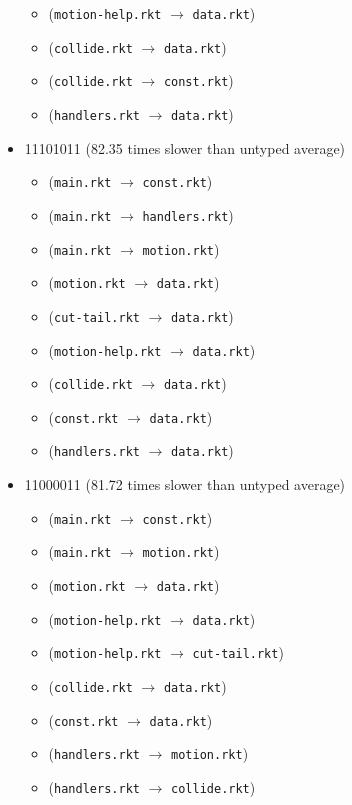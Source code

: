 \documentclass{article}
\newcommand{\mono}[1]{\texttt{#1}}
\begin{document}
\begin{itemize}
\begin{itemize}
  \item (\mono{motion-help.rkt} $\rightarrow$ \mono{data.rkt})
  \item (\mono{collide.rkt} $\rightarrow$ \mono{data.rkt})
  \item (\mono{collide.rkt} $\rightarrow$ \mono{const.rkt})
  \item (\mono{handlers.rkt} $\rightarrow$ \mono{data.rkt})
  \end{itemize}
\item 11101011 (82.35 times slower than untyped average)
  \begin{itemize}
  \item (\mono{main.rkt} $\rightarrow$ \mono{const.rkt})
  \item (\mono{main.rkt} $\rightarrow$ \mono{handlers.rkt})
  \item (\mono{main.rkt} $\rightarrow$ \mono{motion.rkt})
  \item (\mono{motion.rkt} $\rightarrow$ \mono{data.rkt})
  \item (\mono{cut-tail.rkt} $\rightarrow$ \mono{data.rkt})
  \item (\mono{motion-help.rkt} $\rightarrow$ \mono{data.rkt})
  \item (\mono{collide.rkt} $\rightarrow$ \mono{data.rkt})
  \item (\mono{const.rkt} $\rightarrow$ \mono{data.rkt})
  \item (\mono{handlers.rkt} $\rightarrow$ \mono{data.rkt})
  \end{itemize}
\item 11000011 (81.72 times slower than untyped average)
  \begin{itemize}
  \item (\mono{main.rkt} $\rightarrow$ \mono{const.rkt})
  \item (\mono{main.rkt} $\rightarrow$ \mono{motion.rkt})
  \item (\mono{motion.rkt} $\rightarrow$ \mono{data.rkt})
  \item (\mono{motion-help.rkt} $\rightarrow$ \mono{data.rkt})
  \item (\mono{motion-help.rkt} $\rightarrow$ \mono{cut-tail.rkt})
  \item (\mono{collide.rkt} $\rightarrow$ \mono{data.rkt})
  \item (\mono{const.rkt} $\rightarrow$ \mono{data.rkt})
  \item (\mono{handlers.rkt} $\rightarrow$ \mono{motion.rkt})
  \item (\mono{handlers.rkt} $\rightarrow$ \mono{collide.rkt})

\end{itemize}
\end{itemize}
\end{document}
